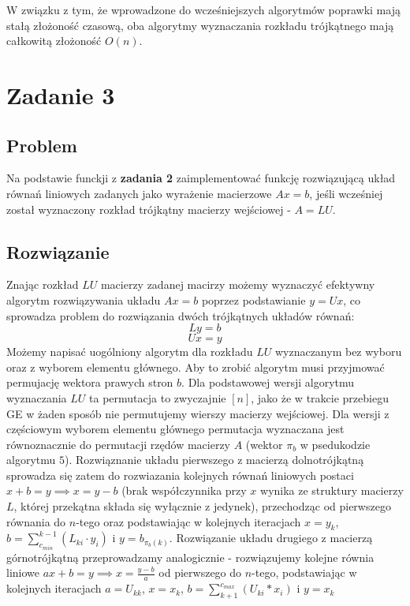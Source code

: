 \documentclass[11pt]{article}
\begin{document}
        \noindent W związku z tym, że wprowadzone do wcześniejszych algorytmów poprawki mają stałą złożoność czasową, oba algorytmy wyznaczania rozkładu trójkątnego mają całkowitą złożoność $O(n)$.

\newpage

\section*{Zadanie 3}
    \subsection*{Problem}
        Na podstawie funckji z \textbf{zadania 2} zaimplementować funkcję rozwiązującą układ równań liniowych zadanych jako wyrażenie macierzowe $Ax = b$, jeśli wcześniej został wyznaczony rozkład trójkątny macierzy wejściowej - $A = LU$.

    \subsection*{Rozwiązanie}
        Znając rozkład $LU$ macierzy zadanej macirzy możemy wyznaczyć efektywny algorytm rozwiązywania układu $Ax = b$ poprzez podstawianie $y = Ux$, co sprowadza problem do rozwiązania dwóch trójkątnych układów równań:
        $$ Ly = b $$
        $$ Ux = y $$
        Możemy napisać uogólniony algorytm dla rozkładu $LU$ wyznaczanym bez wyboru oraz z wyborem elementu głównego. Aby to zrobić algorytm musi przyjmować permujację wektora prawych stron $b$. Dla podstawowej wersji algorytmu wyznaczania $LU$ ta permutacja to zwyczajnie $[n]$, jako że w trakcie przebiegu GE w żaden sposób nie permutujemy wierszy macierzy wejściowej. Dla wersji z częściowym wyborem elementu głównego permutacja wyznaczana jest równoznacznie do permutacji rzędów macierzy $A$ (wektor $\pi_b$ w psedukodzie algorytmu $5$).
        \newline\newline
        Rozwiąznanie układu pierwszego z macierzą dolnotrójkątną sprowadza się zatem do rozwiazania kolejnych równań liniowych postaci $x + b = y \implies x = y - b$ (brak współczynnika przy $x$ wynika ze struktury macierzy $L$, której przekątna składa się wyłącznie z jedynek), przechodząc od pierwszego równania do $n$-tego oraz podstawiając w kolejnych iteracjach $x = y_k$, $b = \sum_{c_{min}}^{k-1}(L_{ki} \cdot y_i)$ i $y = b_{\pi_b(k)}$.
        \newline
        Rozwiązanie układu drugiego z macierzą górnotrójkątną przeprowadzamy analogicznie - rozwiązujemy kolejne równia liniowe $ax + b = y \implies x = \frac{y - b}{a}$ od pierwszego do $n$-tego, podstawiając w kolejnych iteracjach $a = U_{kk}$, $x = x_k$, $b = \sum_{k + 1}^{c_{max}}(U_{ki} * x_i)$ i $y = x_k$
\end{document}
